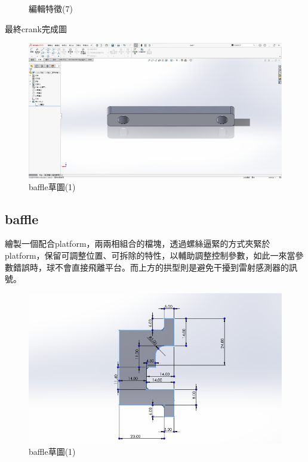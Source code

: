 \begin{figure}[h!]
\begin{minipage}[b]{0.35\textwidth}
        \caption{編輯特徵(7)}
        \label{fig:feature1}
    \end{minipage}
\end{figure}

最終crank完成圖

\begin{figure}[htbp]
    \centering
    \includegraphics[width=1\textwidth]{./../images/螢幕擷取畫面 2024-05-25 230501}
    \caption{baffle草圖(1)}
\end{figure}

\newpage

\subsection{baffle}

繪製一個配合platform，兩兩相組合的檔塊，透過螺絲逼緊的方式夾緊於platform，保留可調整位置、可拆除的特性，以輔助調整控制參數，如此一來當參數錯誤時，球不會直接飛離平台。而上方的拱型則是避免干擾到雷射感測器的訊號。

\begin{figure}[htbp]
    \centering
    \includegraphics[width=1\textwidth]{./../images/螢幕擷取畫面 2024-05-25 224335}
    \caption{baffle草圖(1)}
\end{figure}

